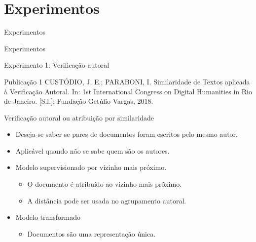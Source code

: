\section{Experimentos}

\begin{frame}{Experimentos}
\begin{alertblock}{Experimentos}
\end{alertblock}
\end{frame}

\begin{frame}{Experimento 1: Verificação autoral}
\fontsize{3.0mm}{4.0mm}\selectfont
\begin{block}{Publicação 1}
	CUSTÓDIO, J. E.; PARABONI, I. Similaridade de Textos aplicada à Verificação Autoral.
	In: 1st International Congress on Digital Humanities in Rio de Janeiro. [S.l.]: Fundação
	Getúlio Vargas, 2018.
\end{block}

\begin{block}{Verificação autoral ou atribuição por similaridade}
	\begin{itemize}
		\item Deseja-se saber se pares de documentos foram escritos pelo mesmo autor. \cite{Koppel2012}
		\item Aplicável quando não se sabe quem são os autores.
		\item Modelo supervisionado por vizinho mais próximo.
		\begin{itemize}\selectFont
			\item O documento é atribuído ao vizinho mais próximo.
			\item A distância pode ser usada no agrupamento autoral.
		\end{itemize}
		\item Modelo transformado
		\begin{itemize}\selectFont
			\item Documentos são uma representação única.
		\end{itemize}
	\end{itemize}
\end{block}
\end{frame}

